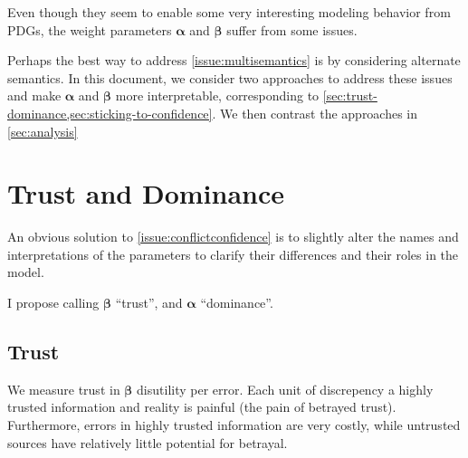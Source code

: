\documentclass[twoside]{article} %
\theoremstyle{plain}
\theoremstyle{definition}
\newcommand{\balpha}{\boldsymbol\alpha}
\newcommand{\bbeta}{\boldsymbol\beta}
\begin{document}
    Even though they seem to enable some very interesting modeling behavior from PDGs, the weight parameters $\balpha$ and $\bbeta$ suffer from some issues.



    Perhaps the best way to address \cref{issue:multisemantics} is by considering alternate semantics.
    In this document, we consider two approaches to address these issues and make $\balpha$ and $\bbeta$ more interpretable, corresponding to \cref{sec:trust-dominance,sec:sticking-to-confidence}. We then contrast the approaches in \cref{sec:analysis}


    \section{Trust and Dominance}\label{sec:trust-dominance}
    An obvious solution to \cref{issue:conflictconfidence} is to slightly alter the names and interpretations of the parameters to clarify their differences and their roles in the model.

    I propose calling $\bbeta$ ``trust'', and $\balpha$ ``dominance''.




    \subsection{Trust}
    We measure trust in $\bbeta$ disutility per error.
    Each unit of discrepency a highly trusted information and reality is painful (the pain of betrayed trust).
    Furthermore, errors in highly trusted information are very costly, while untrusted sources have relatively little potential for betrayal.
\end{document}
